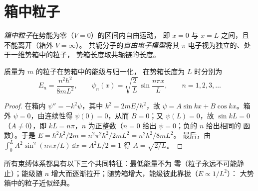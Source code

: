 \section{箱中粒子}

\begin{definition}\label{def:b3:quantum-model-systems:box}
\emph{箱中粒子}在势能为零（$V = 0$）的区间内自由运动，
即 $x = 0$ 与 $x = L$ 之间，且不能离开（箱外 $V = \infty$）。
共轭分子的\emph{自由电子模型}将其
$\pi$ 电子视为独立的、处于一维势箱中的粒子，
势箱长度取共轭链的长度。
\end{definition}

\begin{theorem}[势箱的能级]\label{thm:b3:quantum-model-systems:box}
质量为 $m$ 的粒子在势箱中的能级与归一化，
在势箱长度为 $L$ 时分别为
\[
E_n = \frac{n^2h^2}{8mL^2}, \qquad \psi_n(x) = \sqrt{\frac2L}\,\sin\frac{n\pi
x}{L}, \qquad n = 1, 2, 3, \dots
\]
\end{theorem}

\begin{proof}
在箱内 $\psi'' = -k^2\psi$，其中 $k^2 = 2mE/\hbar^2$，故 $\psi = A\sin kx +
B\cos kx$。箱外 $\psi = 0$，由连续性得 $\psi(0) = 0$，从而 $B =
0$；又 $\psi(L) = 0$，故 $\sin kL = 0$（$A \ne 0$），即 $kL = n\pi$，$n$
为正整数（$n = 0$ 给出 $\psi = 0$；负的 $n$ 给出相同的
函数）。于是 $E = \hbar^2k^2/2m = n^2\pi^2\hbar^2/2mL^2 = n^2h^2/8mL^2$。
最后，由 $\int_0^L A^2\sin^2(n\pi x/L)\,\dd x = A^2L/2 = 1$ 得 $A =
\sqrt{2/L}$。
\end{proof}

所有束缚体系都具有以下三个共同特征：最低能量不为
零（粒子永远不可能静止）；能级随 $n$
增大而逐渐拉开；随势箱增大，能级彼此靠拢（$E \propto 1/L^2$）：
大势箱中的粒子近似经典。

